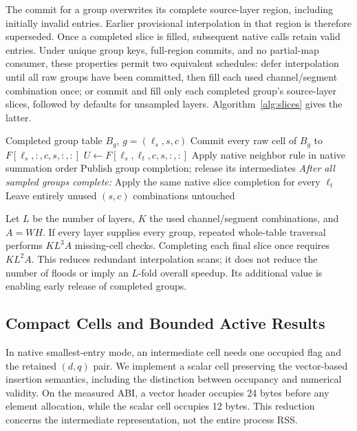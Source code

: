 \documentclass[conference,10pt,letterpaper]{IEEEtran}
\begin{document}
The commit for a group overwrites its complete source-layer region, including initially invalid entries. Earlier provisional interpolation in that region is therefore superseded. Once a completed slice is filled, subsequent native calls retain valid entries. Under unique group keys, full-region commits, and no partial-map consumer, these properties permit two equivalent schedules: defer interpolation until all raw groups have been committed, then fill each used channel/segment combination once; or commit and fill only each completed group's source-layer slices, followed by defaults for unsampled layers. Algorithm~\ref{alg:slices} gives the latter.

\begin{algorithm}[t]
\caption{Equivalent source-layer slice completion}
\label{alg:slices}
\footnotesize
\begin{algorithmic}[1]
\Require Completed group table $B_g$, $g=(\ell_s,s,c)$
\State Commit every raw cell of $B_g$ to $F[\ell_s,:,c,s,:,:]$
 \State $U\gets F[\ell_s,\ell_t,c,s,:,:]$
    \State Apply native neighbor rule in native summation order
   \EndIf
  \EndFor
 \EndFor
\EndFor
\State Publish group completion; release its intermediates
\Statex \textit{After all sampled groups complete:}
 \State Apply the same native slice completion for every $\ell_t$
\EndFor
\State Leave entirely unused $(s,c)$ combinations untouched
\end{algorithmic}
\end{algorithm}

Let $L$ be the number of layers, $K$ the used channel/segment combinations, and $A=WH$. If every layer supplies every group, repeated whole-table traversal performs $KL^3A$ missing-cell checks. Completing each final slice once requires $KL^2A$. This reduces redundant interpolation scans; it does not reduce the number of floods or imply an $L$-fold overall speedup. Its additional value is enabling early release of completed groups.

\subsection{Compact Cells and Bounded Active Results}
In native smallest-entry mode, an intermediate cell needs one occupied flag and the retained $(d,q)$ pair. We implement a scalar cell preserving the vector-based insertion semantics, including the distinction between occupancy and numerical validity. On the measured ABI, a vector header occupies 24 bytes before any element allocation, while the scalar cell occupies 12 bytes. This reduction concerns the intermediate representation, not the entire process RSS.
\end{document}
